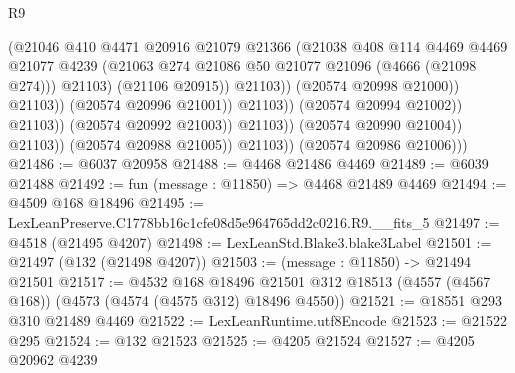 \begin{lexlean}{R9}
\begin{coremodule}
                                                (@21046
                                                  @410
                                                  @4471
                                                  @20916
                                                  @21079
                                                  @21366
                                                  (@21038
                                                    @408
                                                    @114
                                                    @4469
                                                    @4469
                                                    @21077
                                                    @4239
                                                    (@21063
                                                      @274
                                                      @21086
                                                      @50
                                                      @21077
                                                      @21096
                                                      (@4666 (@21098 @274)))
                                                    @21103)
                                                  (@21106 @20915))
                                                @21103))
                                            (@20574 @20998 @21000))
                                          @21103))
                                      (@20574 @20996 @21001))
                                    @21103))
                                (@20574 @20994 @21002))
                              @21103))
                          (@20574 @20992 @21003))
                        @21103))
                    (@20574 @20990 @21004))
                  @21103))
              (@20574 @20988 @21005))
            @21103))
        (@20574 @20986 @21006)))
@21486 := @6037 @20958
@21488 := @4468 @21486 @4469
@21489 := @6039 @21488
@21492 := fun (message : @11850) => @4468 @21489 @4469
@21494 := @4509 @168 @18496
@21495 := LexLeanPreserve.C1778bb16c1cfe08d5e964765dd2c0216.R9.__fits_5
@21497 := @4518 (@21495 @4207)
@21498 := LexLeanStd.Blake3.blake3Label
@21501 := @21497 (@132 (@21498 @4207))
@21503 := (message : @11850) -> @21494 @21501
@21517 := @4532
    @168
    @18496
    @21501
    @312
    @18513
    (@4557 (@4567 @168))
    (@4573 (@4574 (@4575 @312) @18496 @4550))
@21521 := @18551 @293 @310 @21489 @4469
@21522 := LexLeanRuntime.utf8Encode
@21523 := @21522 @295
@21524 := @132 @21523
@21525 := @4205 @21524
@21527 := @4205 @20962 @4239

\end{coremodule}
\end{lexlean}
